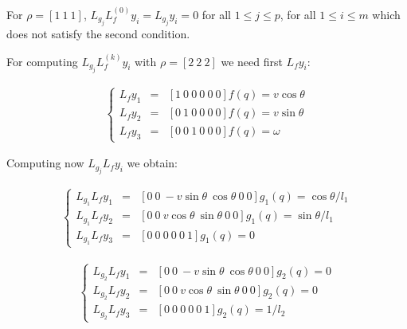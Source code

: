 \documentclass[letterpaper, 10 pt, conference]{ieeeconf}  %
\begin{document}
For ${\rho = [1\ 1\ 1]}$, ${L_{g_j}L_f^{(0)}y_i = L_{g_j}y_i = 0}$ for all ${1 \leq j \leq p}$, for all ${1 \leq i \leq m}$ which does not satisfy the second condition.

%

For computing $L_{g_j}L_f^{(k)}y_i$ with $\rho = [2\ 2\ 2]$ we need first $L_fy_i$:

\begin{eqnarray}
\left\lbrace\begin{array}{lcl}
L_{f}y_1 & = & [1\ 0\ 0\ 0\ 0\ 0]f(q) = v\cos\theta\\
L_{f}y_2 & = & [0\ 1\ 0\ 0\ 0\ 0]f(q) = v\sin\theta\\
L_{f}y_3 & = & [0\ 0\ 1\ 0\ 0\ 0]f(q) = \omega
\end{array}\right.
\end{eqnarray}

Computing now $L_{g_j}L_fy_i$ we obtain:

\begin{eqnarray}
\left\lbrace\begin{array}{lcl}
L_{g_1}L_{f}y_1 & = & [0\ 0\ -v\sin\theta\ \cos\theta\ 0\ 0]g_1(q) = \cos\theta/l_1\\
L_{g_1}L_{f}y_2 & = & [0\ 0\ v\cos\theta\ \sin\theta\ 0\ 0]g_1(q) = \sin\theta/l_1\\
L_{g_1}L_{f}y_3 & = & [0\ 0\ 0\ 0\ 0\ 1]g_1(q) = 0
\end{array}\right.
\end{eqnarray}

\begin{eqnarray}
\left\lbrace\begin{array}{lcl}
L_{g_2}L_{f}y_1 & = & [0\ 0\ -v\sin\theta\ \cos\theta\ 0\ 0]g_2(q) = 0\\
L_{g_2}L_{f}y_2 & = & [0\ 0\ v\cos\theta\ \sin\theta\ 0\ 0]g_2(q) = 0\\
L_{g_2}L_{f}y_3 & = & [0\ 0\ 0\ 0\ 0\ 1]g_2(q) = 1/l_2
\end{array}\right.
\end{eqnarray}
\end{document}
